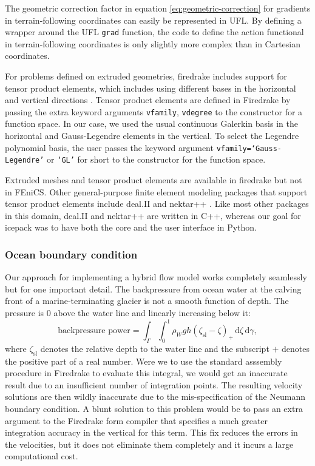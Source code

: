 \documentclass{article}
\theoremstyle{definition}
\theoremstyle{plain}
\newcommand{\ud}{\hspace{2pt}\mathrm{d}}
\begin{document}
The geometric correction factor in equation \eqref{eq:geometric-correction} for gradients in terrain-following coordinates can easily be represented in UFL.
By defining a wrapper around the UFL \texttt{grad} function, the code to define the action functional in terrain-following coordinates is only slightly more complex than in Cartesian coordinates.

For problems defined on extruded geometries, firedrake includes support for tensor product elements, which includes using different bases in the horizontal and vertical directions \citep{mcrae2016automated}.
Tensor product elements are defined in Firedrake by passing the extra keyword arguments \texttt{vfamily}, \texttt{vdegree} to the constructor for a function space.
In our case, we used the usual continuous Galerkin basis in the horizontal and Gauss-Legendre elements in the vertical.
To select the Legendre polynomial basis, the user passes the keyword argument \texttt{vfamily=`Gauss-Legendre'} or \texttt{`GL'} for short to the constructor for the function space.

Extruded meshes and tensor product elements are available in firedrake but not in FEniCS.
Other general-purpose finite element modeling packages that support tensor product elements include deal.II and nektar++ \citep{bangerth2007deal, cantwell2015nektar++}.
Like most other packages in this domain, deal.II and nektar++ are written in C++, whereas our goal for icepack was to have both the core and the user interface in Python.

\subsubsection{Ocean boundary condition}

Our approach for implementing a hybrid flow model works completely seamlessly but for one important detail.
The backpressure from ocean water at the calving front of a marine-terminating glacier is not a smooth function of depth.
The pressure is 0 above the water line and linearly increasing below it:
\begin{equation}
    \text{backpressure power} = \int_\Gamma\int_0^1 \rho_Wgh(\zeta_{\text{sl}} - \zeta)_+\ud\zeta\ud\gamma,
    \label{backpressure}
\end{equation}
where $\zeta_{\text{sl}}$ denotes the relative depth to the water line and the subscript $+$ denotes the positive part of a real number.
Were we to use the standard asssembly procedure in Firedrake to evaluate this integral, we would get an inaccurate result due to an insufficient number of integration points.
The resulting velocity solutions are then wildly inaccurate due to the mis-specification of the Neumann boundary condition.
A blunt solution to this problem would be to pass an extra argument to the Firedrake form compiler that specifies a much greater integration accuracy in the vertical for this term.
This fix reduces the errors in the velocities, but it does not eliminate them completely and it incurs a large computational cost.
\end{document}
